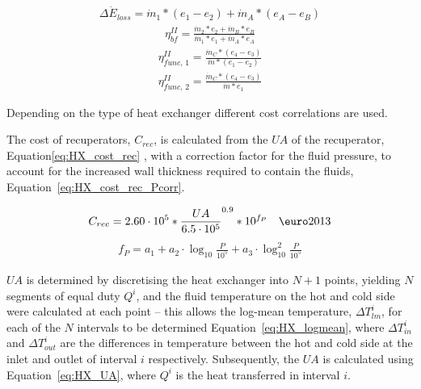         \begin{align}
            \Delta\Dot{E}_{loss} = \Dot{m}_1*(e_1 - e_2) + \Dot{m}_A*(e_A - e_B) \label{eq:HX_exloss}
        \end{align}
        \begin{align}
            \eta_{bf}^{II}= \frac{\Dot{m}_2*e_2 + \Dot{m}_B*e_B}{\Dot{m}_1*e_1 + \Dot{m}_A*e_A} \label{eq:HX_exBF}
        \end{align}
        \begin{align}
            \eta_{func,\,1}^{II}= \frac{\Dot{m}_C*(e_4 - e_3)}{\Dot{m}*(e_1 - e_2)} \label{eq:HX_exFUNC1}
        \end{align}
        \begin{align}
            \eta_{func,\,2}^{II}= \frac{\Dot{m}_C*(e_4 - e_3)}{\Dot{m}*e_1} \label{eq:heatX_exFUNC2}
        \end{align}

        Depending on the type of heat exchanger different cost correlations are used.

        The cost of recuperators, \(C_{rec}\), is calculated from the \(UA\) of the recuperator,  Equation\ref{eq:HX_cost_rec} \cite{Astolfi2014B}, with a correction factor for the fluid pressure, to account for the increased wall thickness required to contain the fluids, Equation~\ref{eq:HX_cost_rec_Pcorr}. 

        \begin{align}
            C_{rec}= 2.60\cdot10^5 * \frac{UA}{6.5\cdot10^5}^{0.9}*10^{f_P} \quad  \textup{\euro}2013 \label{eq:HX_cost_rec}
        \end{align}
        \begin{align}
            f_P= a_1 + a_2\cdot \log_{10}\frac{P}{10^5} +a_3\cdot\log_{10}^2\frac{P}{10^5} \label{eq:HX_cost_rec_Pcorr}
        \end{align}

        \(UA\) is determined by discretising the heat exchanger into \(N+1\) points, yielding \(N\) segments of equal duty \(Q^i\), and the fluid temperature on the hot and cold side were calculated at each point – this allows the log-mean temperature, \(\Delta T_{lm}^i\), for each of the \(N\) intervals to be determined Equation~\ref{eq:HX_logmean}, where \(\Delta T_{in}^i\) and \(\Delta T_{out}^i\) are the differences in temperature between the hot and cold side at the inlet and outlet of interval \(i\) respectively. Subsequently, the \(UA\) is calculated using Equation~\ref{eq:HX_UA}, where \(Q^i\) is the heat transferred in interval \(i\).

